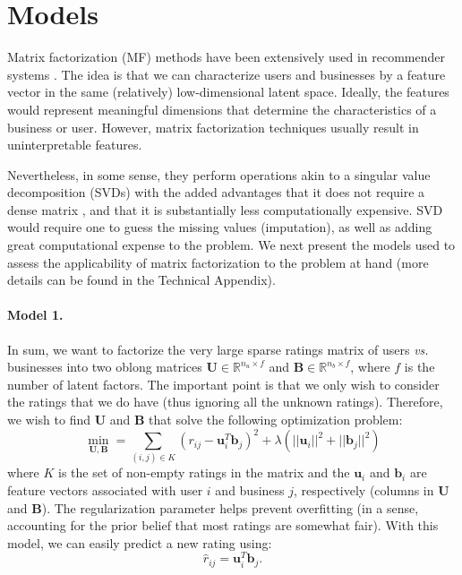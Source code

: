 \documentclass[12pt]{article}
\newcommand{\mbf}[1]{\mathbf{#1}}
\begin{document}
\section{Models}\label{models}

Matrix factorization (MF) methods have been extensively used in recommender systems \cite{koren09}. The idea is that we can characterize users and businesses by a feature vector in the same (relatively) low-dimensional latent space. Ideally, the features would represent meaningful dimensions that determine the characteristics of a business or user. However, matrix factorization techniques usually result in uninterpretable features. 

Nevertheless, in some sense, they perform operations akin to a singular value decomposition (SVDs) with the added advantages that it does not require a dense matrix , and that it is substantially less computationally expensive. SVD would require one to guess the missing values (imputation), as well as adding great computational expense to the problem. We next present the models used to assess the applicability of matrix factorization to the problem at hand (more details can be found in the Technical Appendix).

\paragraph{Model 1.} In sum, we want to factorize the very large sparse ratings matrix of users \emph{vs.} businesses into two oblong matrices $\mbf U\in\mathbb{R}^{n_u\times f}$ and $\mbf B\in\mathbb{R}^{n_b\times f}$, where $f$ is the number of latent factors. The important point is that we only wish to consider the ratings that we do have (thus ignoring all the unknown ratings). Therefore, we wish to find $\mbf U$ and $\mbf B$ that solve the following optimization problem:
\begin{equation}
\min_{\mbf U,\mbf B} = \sum_{(i,j)\in K} (r_{ij}-\mbf u_i^T\mbf b_j)^2+\lambda\left(||\mbf u_i||^2+||\mbf b_j||^2\right)
\end{equation}
where $K$ is the set of non-empty ratings in the matrix and the $\mbf u_i$ and $\mbf b_i$ are feature vectors associated with user $i$ and business $j$, respectively (columns in $\mbf U$ and $\mbf B$). The regularization parameter helps prevent overfitting (in a sense, accounting for the prior belief that most ratings are somewhat fair). With this model, we can easily predict a new rating using:
\begin{equation}
\hat r_{ij} = \mbf u_i^T\mbf b_j.
\end{equation}
\end{document}
